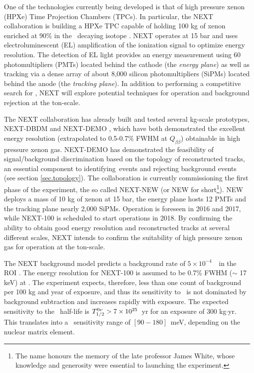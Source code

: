 \documentclass[a4paper,11pt]{article}
\begin{document}
One of the technologies currently being developed is that of high pressure xenon (HPXe) Time Projection Chambers (TPCs). In particular, the NEXT collaboration \cite{Gomez-Cadenas:2014dxa} is building a HPXe TPC capable of holding 100 kg of xenon enriched at 90\% in the \bb\ decaying isotope \XE. NEXT operates at 15 bar and uses electroluminescent (EL) amplification of the ionization signal to optimize energy resolution. The detection of EL light provides an energy measurement using 60 photomultipliers (PMTs) located behind the cathode (the \emph{energy plane}) as well as tracking  via a dense array of about 8,000 silicon photomultipliers (SiPMs) located behind the anode (the \emph{tracking plane}).
In addition to performing a competitive search for \bbonu, NEXT will explore potential 
techniques for operation and background rejection at the ton-scale.  

The NEXT collaboration has already built and tested several kg-scale prototypes, NEXT-DBDM \cite{Alvarez:2012kua} and
NEXT-DEMO \cite{Alvarez:2012xda,Alvarez:2012kua,Alvarez:2013gxa,Lorca:2014sra}, which have both demonstrated the excellent energy resolution (extrapolated to 0.5-0.7\% FWHM at
$Q_{\beta\beta}$) obtainable in high pressure xenon gas.  NEXT-DEMO has demonstrated the feasibility of signal/background discrimination based on the topology of reconstructed tracks,
an essential component to identifying \bbonu\,events and rejecting background events (see section \ref{sec.topology}).  The collaboration is currently commissioning the first phase of the experiment, the so called NEXT-NEW (or NEW for short\footnote{The name honours the memory of the late professor James White, whose knowledge and generosity were essential to launching the experiment.}). NEW deploys a  mass of 10 kg of xenon at 15 bar, the energy plane hosts 12 PMTs and the tracking plane nearly 2,000 SiPMs. Operation is foreseen in 2016 and 2017, while NEXT-100 is scheduled to start operations in 2018.  By confirming the ability to obtain good energy resolution and reconstructed tracks at several different scales, NEXT 
intends to confirm the suitability of high pressure xenon gas for operation at the ton-scale.


The NEXT background model predicts a background rate of $5 \times 10^{-4}$~\ckky\ in the ROI  \cite{Martin-Albo:2015rhw}. The energy resolution for NEXT-100 is assumed to be 0.7\% FWHM ($\sim$ 17 keV) at \Qbb. The experiment expects, therefore, less than one count of background per 100 kg and year of exposure, and thus its sensitivity to \Tonu\ is not dominated by background subtraction and increases rapidly with exposure. The expected sensitivity to the \bbonu\ half-life is $T_{1/2}^{0\nu} > 7 \times 10^{25}$~yr for an exposure of 300 kg$\cdot$yr. This translates into a \mbb\ sensitivity range of $[90-180]$~meV, depending on the nuclear matrix element.
\end{document}
